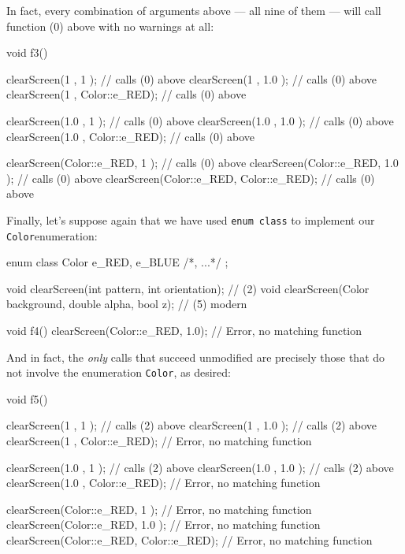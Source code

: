 \noindent In fact, every combination of arguments above --- all nine of them ---
will call function (0) above with no warnings at all:

\begin{emcppslisting}[emcppsbatch=e9]
void f3()
{
    clearScreen(1           , 1           );  // calls (0) above
    clearScreen(1           , 1.0         );  // calls (0) above
    clearScreen(1           , Color::e_RED);  // calls (0) above

    clearScreen(1.0         , 1           );  // calls (0) above
    clearScreen(1.0         , 1.0         );  // calls (0) above
    clearScreen(1.0         , Color::e_RED);  // calls (0) above

    clearScreen(Color::e_RED, 1           );  // calls (0) above
    clearScreen(Color::e_RED, 1.0         );  // calls (0) above
    clearScreen(Color::e_RED, Color::e_RED);  // calls (0) above
}
\end{emcppslisting}

\noindent Finally, let's suppose again that we have used
\texttt{enum}~\texttt{class} to implement our \texttt{Color}\linebreak[4]
\mbox{enumeration}:

\begin{emcppshiddenlisting}[emcppsbatch=e10]
enum class Color { e_RED, e_BLUE /*, ...*/ };
\end{emcppshiddenlisting}
\begin{emcppslisting}[emcppsbatch=e10]
void clearScreen(int pattern, int orientation);            // (2)
void clearScreen(Color background, double alpha, bool z);  // (5) modern

void f4()
{
    clearScreen(Color::e_RED, 1.0);  // Error, no matching function
}
\end{emcppslisting}

\noindent And in fact, the \emph{only} calls that succeed unmodified are precisely
those that do not involve the enumeration \texttt{Color}, as desired:

\begin{emcppslisting}[emcppsbatch=e10]
void f5()
{
    clearScreen(1           , 1           );  // calls (2) above
    clearScreen(1           , 1.0         );  // calls (2) above
    clearScreen(1           , Color::e_RED);  // Error, no matching function

    clearScreen(1.0         , 1           );  // calls (2) above
    clearScreen(1.0         , 1.0         );  // calls (2) above
    clearScreen(1.0         , Color::e_RED);  // Error, no matching function

    clearScreen(Color::e_RED, 1           );  // Error, no matching function
    clearScreen(Color::e_RED, 1.0         );  // Error, no matching function
    clearScreen(Color::e_RED, Color::e_RED);  // Error, no matching function
}
\end{emcppslisting}

